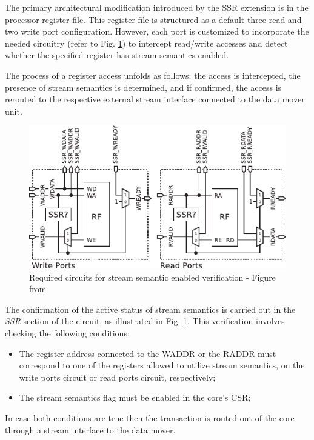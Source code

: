 The primary architectural modification introduced by the SSR extension is in the processor register file. This register file is structured as a default three read and two write port configuration. However, each port is customized to incorporate the needed circuitry (refer to Fig. \ref{fig:ssr-stream_enable_check}) to intercept read/write accesses and detect whether the specified register has stream semantics enabled.

The process of a register access unfolds as follows: the access is intercepted, the presence of stream semantics is determined, and if confirmed, the access is rerouted to the respective external stream interface connected to the data mover unit.

\begin{figure}[H]
	\begin{center}
 		\includegraphics[width=0.67\linewidth]{images/ssr-circuitry.pdf}
 		\caption{Required circuits for stream semantic enabled verification  - Figure from \cite{9068465}}
 		\label{fig:ssr-stream_enable_check}
	\end{center} 
\end{figure}

The confirmation of the active status of stream semantics is carried out in the \textit{SSR} section of the circuit, as illustrated in Fig. \ref{fig:ssr-stream_enable_check}. This verification involves checking the following conditions:

\begin{itemize}
\item[1] The register address connected to the WADDR or the RADDR must correspond to one of the registers allowed to utilize stream semantics, on the write ports circuit or read ports circuit, respectively;
\item[2] The stream semantics flag must be enabled in the core's CSR;
\end{itemize}

In case both conditions are true then the transaction is routed out of the core through a stream interface to the data mover.

